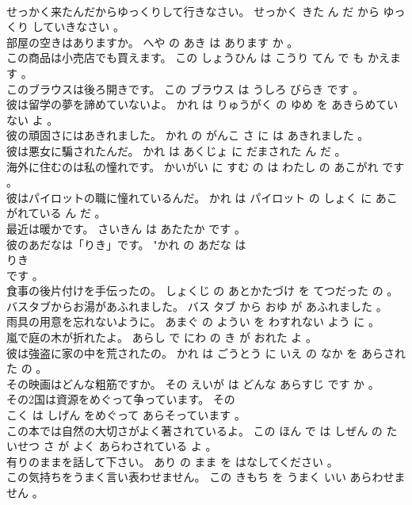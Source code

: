 \documentclass[8pt]{extreport}
\begin{document}
\begin{CJK}{UTF8}{min}
\\	せっかく来たんだからゆっくりして行きなさい。	せっかく きた ん だ から ゆっくり していきなさい 。 
\\	部屋の空きはありますか。	へや の あき は あります か 。 
\\	この商品は小売店でも買えます。	この しょうひん は こうり てん で も かえます 。 
\\	このブラウスは後ろ開きです。	この ブラウス は うしろ びらき です 。 
\\	彼は留学の夢を諦めていないよ。	かれ は りゅうがく の ゆめ を あきらめていない よ 。 
\\	彼の頑固さにはあきれました。	かれ の がんこ さ に は あきれました 。 
\\	彼は悪女に騙されたんだ。	かれ は あくじょ に だまされた ん だ 。 
\\	海外に住むのは私の憧れです。	かいがい に すむ の は わたし の あこがれ です 。 
\\	彼はパイロットの職に憧れているんだ。	かれ は パイロット の しょく に あこがれている ん だ 。 
\\	最近は暖かです。	さいきん は あたたか です 。 
\\	彼のあだなは「りき」です。	"かれ の あだな は 
\\	りき 
\\	です 。 
\\	食事の後片付けを手伝ったの。	しょくじ の あとかたづけ を てつだった の 。 
\\	バスタブからお湯があふれました。	バス タブ から おゆ が あふれました 。 
\\	雨具の用意を忘れないように。	あまぐ の ようい を わすれない よう に 。 
\\	嵐で庭の木が折れたよ。	あらし で にわ の き が おれた よ 。 
\\	彼は強盗に家の中を荒されたの。	かれ は ごうとう に いえ の なか を あらされた の 。 
\\	その映画はどんな粗筋ですか。	その えいが は どんな あらすじ です か 。 
\\	その2国は資源をめぐって争っています。	その 
\\	こく は しげん をめぐって あらそっています 。 
\\	この本では自然の大切さがよく著されているよ。	この ほん で は しぜん の たいせつ さ が よく あらわされている よ 。 
\\	有りのままを話して下さい。	あり の まま を はなしてください 。 
\\	この気持ちをうまく言い表わせません。	この きもち を うまく いい あらわせません 。 

\end{CJK}
\end{document}
